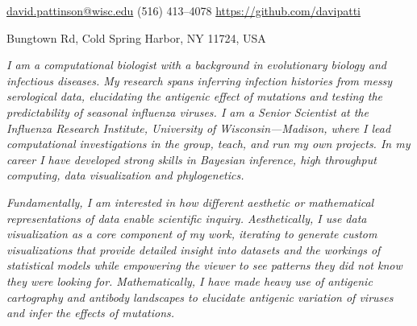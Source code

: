 \documentclass[10pt,a4paper]{article}
\begin{document}
\sloppy  %


\nobreakvspace{0.3em}  %

\noindent\href{mailto:david.pattinson@wisc.edu}{david.pattinson\mbox{}@\mbox{}wisc.edu}\sbull
{} (516) 413--4078\sbull
\href{https://github.com/davipatti}{https://github.com/davipatti}
\par {} Bungtown Rd, Cold Spring Harbor, NY 11724, USA

\spacedhrule{0.5em}{-0.4em}  %

 \begin{multicols}{2}

  \emph{ I am a computational biologist with a background in evolutionary biology and
  infectious diseases. My research spans inferring infection histories from messy
  serological data, elucidating the antigenic effect of mutations and testing the
  predictability of seasonal influenza viruses. I am a Senior Scientist at the Influenza
  Research Institute, University of Wisconsin---Madison, where I lead computational
  investigations in the group, teach, and run my own projects. In my career I have
  developed strong skills in Bayesian inference, high throughput computing, data
  visualization and phylogenetics. }

  \emph{ Fundamentally, I am interested in how different aesthetic or mathematical
  representations of data enable scientific inquiry. Aesthetically, I use data
  visualization as a core component of my work, iterating to generate custom
  visualizations that provide detailed insight into datasets and the workings of
  statistical models while empowering the viewer to see patterns they did not know they
  were looking for. Mathematically, I have made heavy use of antigenic cartography and
  antibody landscapes to elucidate antigenic variation of viruses and infer the effects
  of mutations. }
\end{multicols}

\spacedhrule{0.9em}{-0.4em}

\end{document}
